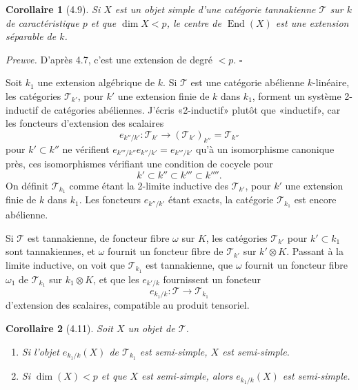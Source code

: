 \documentclass[10pt]{article}
\newcommand{\End}{\operatorname{End}}
\newcommand{\T}{\mathcal T}
\theoremstyle{deligne}
\newtheorem*{corollary*}{Corollaire}
\newenvironment{proofdel}{\textit{Preuve.}}{\hfill$\square$}
\newcommand{\heading}[1]{\vspace{0.7em}\noindent{\bfseries #1}\quad}
\begin{document}
\begin{corollary*}[4.9]
Si \(X\) est un objet simple d'une catégorie tannakienne \(\T\) sur \(k\) de caractéristique \(p\) et que \(\dim X<p\), le centre de \(\End(X)\) est une extension séparable de \(k\).
\end{corollary*}

\begin{proofdel}
D'après 4.7, c'est une extension de degré \(<p\).
\end{proofdel}

\heading{4.10.}
Soit \(k_1\) une extension algébrique de \(k\). Si \(\T\) est une catégorie abélienne \(k\)-linéaire, les catégories \(\T_{k'}\), pour \(k'\) une extension finie de \(k\) dans \(k_1\), forment un système 2-inductif de catégories abéliennes. J'écris «2-inductif» plutôt que «inductif», car les foncteurs d'extension des scalaires
\[
e_{k''/k'}:\T_{k'}\longrightarrow (\T_{k'})_{k''}=\T_{k''}
\]
pour \(k'\subset k''\) ne vérifient \(e_{k'''/k''}e_{k''/k'}=e_{k'''/k'}\) qu'à un isomorphisme canonique près, ces isomorphismes vérifiant une condition de cocycle pour
\[
k'\subset k''\subset k'''\subset k''''.
\]
On définit \(\T_{k_1}\) comme étant la 2-limite inductive des \(\T_{k'}\), pour \(k'\) une extension finie de \(k\) dans \(k_1\). Les foncteurs \(e_{k''/k'}\) étant exacts, la catégorie \(\T_{k_1}\) est encore abélienne.

Si \(\T\) est tannakienne, de foncteur fibre \(\omega\) sur \(K\), les catégories \(\T_{k'}\) pour \(k'\subset k_1\) sont tannakiennes, et \(\omega\) fournit un foncteur fibre de \(\T_{k'}\) sur \(k'\otimes K\). Passant à la limite inductive, on voit que \(\T_{k_1}\) est tannakienne, que \(\omega\) fournit un foncteur fibre \(\omega_1\) de \(\T_{k_1}\) sur \(k_1\otimes K\), et que les \(e_{k'/k}\) fournissent un foncteur
\[
e_{k_1/k}:\T\longrightarrow \T_{k_1}
\]
d'extension des scalaires, compatible au produit tensoriel.

\begin{corollary*}[4.11]
Soit \(X\) un objet de \(\T\).
\begin{enumerate}[label=(\roman*)]
\item Si l'objet \(e_{k_1/k}(X)\) de \(\T_{k_1}\) est semi-simple, \(X\) est semi-simple.
\item Si \(\dim(X)<p\) et que \(X\) est semi-simple, alors \(e_{k_1/k}(X)\) est semi-simple.
\end{enumerate}
\end{corollary*}
\end{document}
